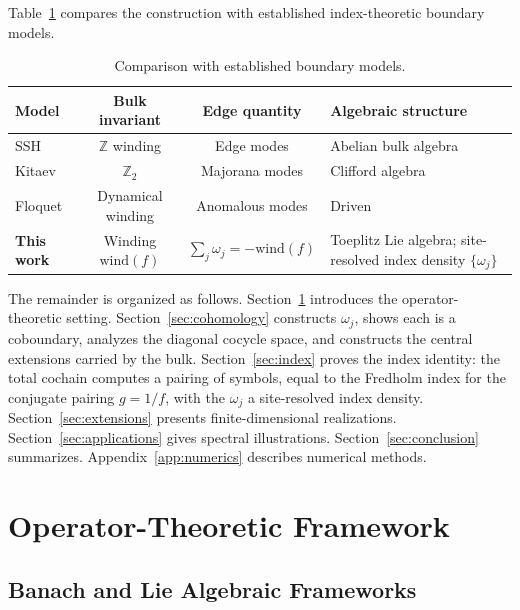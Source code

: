\documentclass[10pt]{amsart}
\newcommand{\1}{{\mathbb{I}}}
\numberwithin{equation}{section}
\begin{document}
\medskip
Table~\ref{tab:comparison} compares the construction with established index-theoretic boundary models.

\begin{table}[hbpt]
\centering
\caption{Comparison with established boundary models.}
\label{tab:comparison}
\begin{tabular}{l c c p{4.3cm}}
Model & Bulk invariant & Edge quantity & Algebraic structure \\
\hline
SSH \cite{SSH79} & $\mathbb{Z}$ winding & Edge modes & Abelian bulk algebra \\
Kitaev \cite{Kitaev01} & $\mathbb{Z}_2$ & Majorana modes & Clifford algebra \\
Floquet \cite{Lindner11} & Dynamical winding & Anomalous modes & Driven \\
\textbf{This work} & Winding $\mathrm{wind}(f)$ & $\sum_j\omega_j=-\mathrm{wind}(f)$ &
  Toeplitz Lie algebra; site-resolved index density $\{\omega_j\}$ \\
\end{tabular}
\end{table}

\medskip\noindent
The remainder is organized as follows. Section~\ref{sec:operator-framework} introduces the
operator-theoretic setting. Section~\ref{sec:cohomology} constructs $\omega_j$, shows each is
a coboundary, analyzes the diagonal cocycle space, and constructs the central extensions
carried by the bulk. Section~\ref{sec:index} proves the index identity: the total cochain
computes a pairing of symbols, equal to the Fredholm index for the conjugate pairing $g=1/f$,
with the $\omega_j$ a site-resolved index density. Section~\ref{sec:extensions} presents
finite-dimensional realizations. Section~\ref{sec:applications} gives spectral illustrations.
Section~\ref{sec:conclusion} summarizes. Appendix~\ref{app:numerics} describes numerical
methods.

\section{Operator-Theoretic Framework}
\label{sec:operator-framework}

\subsection{Banach and Lie Algebraic Frameworks}
\label{sec:boundary-Lie}
\end{document}
